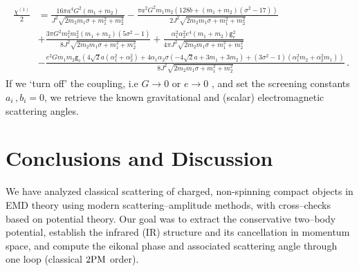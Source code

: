 \begin{align}
    \begin{split}
        \frac{\chi^{(1)}}{2}&= \frac{16 \pi  a^4 G^2 \left(m_1+m_2\right)}{J^2 \sqrt{2 m_2 m_1 \sigma +m_1^2+m_2^2}} -\frac{\pi  a^2 G^2 m_1 m_2 \left(128 b+\left(m_1+m_2\right) \left(\sigma ^2-17\right)\right)}{2 J^2 \sqrt{2 m_2 m_1 \sigma +m_1^2+m_2^2}} \\
        & + \frac{3 \pi  G^2 m_1^2 m_2^2 \left(m_1+m_2\right) \left(5 \sigma ^2-1\right)}{8 J^2 \sqrt{2 m_2 m_1 \sigma +m_1^2+m_2^2}} +\frac{\alpha _1^2 \alpha _2^2 e^4 \left(m_1+m_2\right) \texttt{g}_c^2}{4 \pi  J^2 \sqrt{2 m_2 m_1 \sigma +m_1^2+m_2^2}} \\
        & -\frac{e^2 G m_1 m_2 \texttt{g}_c \left(4 \sqrt{2} a \left(\alpha _1^2+\alpha _2^2\right)+4 \alpha _1 \alpha _2 \sigma  \left(-4 \sqrt{2} a+3 m_1+3 m_2\right)+\left(3 \sigma ^2-1\right) \left(\alpha _1^2 m_2+\alpha _2^2 m_1\right)\right)}{8 J^2 \sqrt{2 m_2 m_1 \sigma +m_1^2+m_2^2}}\,.
    \end{split}
\end{align}
If we `turn off' the coupling, i.e $G \rightarrow 0$ \cite{Bern:2021xze} or $e \rightarrow0$ \cite{Mogull:2020sak}, and set the screening constants $a_i \, ,  b_i =0$, we retrieve the known gravitational and (scalar) electromagnetic scattering angles. 
\section{Conclusions and Discussion}
\label{sec:conclusions}
We have analyzed classical scattering of charged, non-spinning compact objects in EMD theory using modern scattering–amplitude methods, with cross–checks based on potential theory. Our goal was to extract the conservative two–body potential, establish the infrared (IR) structure and its cancellation in momentum space, and compute the eikonal phase and associated scattering angle through one loop (classical $2{\rm PM}$ order).


